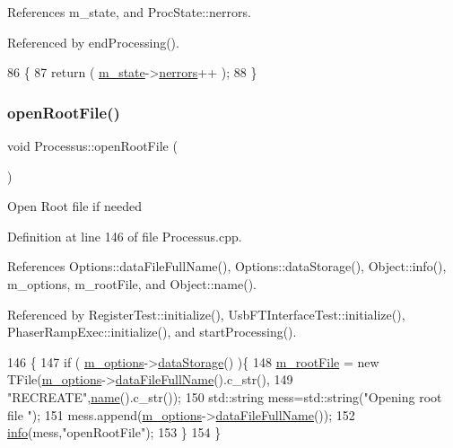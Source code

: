 References m\+\_\+state, and Proc\+State\+::nerrors.



Referenced by end\+Processing().


\begin{DoxyCode}
86                                 \{
87   \textcolor{keywordflow}{return} ( \hyperlink{classProcessus_ab3539eee42891ceae0baf4395ae7fb61}{m\_state}->\hyperlink{structProcState_a51a0f54ba62b07e07ac8518c5f32828d}{nerrors}++ );
88 \}
\end{DoxyCode}
\mbox{\label{classProcessus_aacf6812880c1d1a2bf14a4a39458f443}} 
\subsubsection{\texorpdfstring{open\+Root\+File()}{openRootFile()}}
{\footnotesize\ttfamily void Processus\+::open\+Root\+File (\begin{DoxyParamCaption}{ }\end{DoxyParamCaption})}

Open Root file if needed 

Definition at line 146 of file Processus.\+cpp.



References Options\+::data\+File\+Full\+Name(), Options\+::data\+Storage(), Object\+::info(), m\+\_\+options, m\+\_\+root\+File, and Object\+::name().



Referenced by Register\+Test\+::initialize(), Usb\+F\+T\+Interface\+Test\+::initialize(), Phaser\+Ramp\+Exec\+::initialize(), and start\+Processing().


\begin{DoxyCode}
146                                \{
147   \textcolor{keywordflow}{if} ( \hyperlink{classProcessus_a74205f3c1e00c4448f7b3257c2351797}{m\_options}->\hyperlink{classOptions_aed7799d10139fa542055b982cb820192}{dataStorage}() )\{
148     \hyperlink{classProcessus_a76114f8cf2111e910c323a7ae05a015d}{m\_rootFile} = \textcolor{keyword}{new} TFile(\hyperlink{classProcessus_a74205f3c1e00c4448f7b3257c2351797}{m\_options}->\hyperlink{classOptions_ab1cd9f237e9c18fd72323c74565453f8}{dataFileFullName}().c\_str(),
149                            \textcolor{stringliteral}{"RECREATE"},\hyperlink{classObject_a300f4c05dd468c7bb8b3c968868443c1}{name}().c\_str());
150         std::string mess=std::string(\textcolor{stringliteral}{"Opening root file "});
151         mess.append(\hyperlink{classProcessus_a74205f3c1e00c4448f7b3257c2351797}{m\_options}->\hyperlink{classOptions_ab1cd9f237e9c18fd72323c74565453f8}{dataFileFullName}());
152         \hyperlink{classObject_a644fd329ea4cb85f54fa6846484b84a8}{info}(mess,\textcolor{stringliteral}{"openRootFile"});
153   \}
154 \}
\end{DoxyCode}
\mbox{\label{classProcessus_a247e8c362ec08422cf53d08dd23b093c}} 

